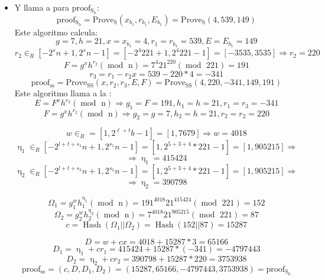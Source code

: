 \begin{itemize}
    \item Y llama a  para $\operatorname{proof_{S_{b}}}$:
    $$\operatorname{proof_{S_{b}}} = \operatorname{Prove_{S}}(x_{b_{1}}, r_{b_{1}}, E_{b_{1}}) = \operatorname{Prove_{S}}(4, 539, 149)$$
    Este algoritmo calcula:
    $$g = 7, h = 21, x = x_{b_{1}} = 4, r_{1} = r_{b_{1}} = 539, E = E_{b_{1}} = 149$$
    $$r_{2} \in_{R} [-2^{s}n+1, 2^{s}n-1] = [-2^{4}221+1, 2^{4}221-1] = [-3535, 3535] \Rightarrow r_{2} = 220$$
    $$F = g^{x}h^{r_{2}} (\operatorname{mod} \text{ n}) = 7^{4}21^{220} (\operatorname{mod} \text{ 221}) = 191$$
    $$r_{3} = r_{1} - r_{2}x = 539 - 220 * 4 = -341$$
    $$\operatorname{proof_{ss}} = \operatorname{Prove_{SS}}(x, r_{2}, r_{3}, E, F) = \operatorname{Prove_{SS}}(4, 220, -341, 149, 191)$$
    Este algoritmo llama a la :
    $$E = F^{x}h^{r_{3}} (\operatorname{mod} \text{ n}) \Rightarrow g_{1} = F = 191, h_{1} = h = 21, r_{1} = r_{3} = -341$$
    $$F = g^{x}h^{r_{2}} (\operatorname{mod} \text{ n}) \Rightarrow g_{2} = g = 7, h_{2} = h = 21, r_{2} = r_{2} = 220$$
    
    $$w \in_{R} = [1, 2^{\ell+t}b-1] = [1, 7679] \Rightarrow w = 4018$$
    $$\upeta_{1} \in_{R} [-2^{l + t + s_{1}}n+1, 2^{s_{1}}n-1] = [1, 2^{5+3+4}*221-1] = [1, 905215] \Rightarrow$$ $$\Rightarrow \upeta_{1} = 415424$$
    $$\upeta_{2} \in_{R} [-2^{l + t + s_{2}}n+1, 2^{s_{2}}n-1] = [1, 2^{5+3+4}*221-1] = [1, 905215] \Rightarrow$$ $$\Rightarrow \upeta_{2} = 390798$$
    
    $$\Omega_{1} = g_{1}^{w}h_{1}^{\upeta_{1}} (\operatorname{mod} \text{ n}) = 191^{4018}21^{415424} (\operatorname{mod} \text{ 221}) = 152$$
    $$\Omega_{2} = g_{2}^{w}h_{2}^{\upeta_{2}} (\operatorname{mod} \text{ n}) = 7^{4018}21^{905215} (\operatorname{mod} \text{ 221}) = 87$$
    $$c = \operatorname{Hash}(\Omega_{1} || \Omega_{2}) = \operatorname{Hash}(152 || 87) = 15287$$
    
    $$D = w + cx = 4018 + 15287 * 3 = 65166$$
    $$D_{1} = \upeta_{1} + cr_{1} =  415424 + 15287 * (-341) = -4797443$$
    $$D_{2} = \upeta_{2} + cr_{2} = 390798 + 15287 * 220 = 3753938$$
    $$\operatorname{proof_{ss}} = (c, D, D_{1}, D_{2}) = (15287, 65166, -4797443, 3753938) = \operatorname{proof_{S_{b}}}$$
    

\end{itemize}
